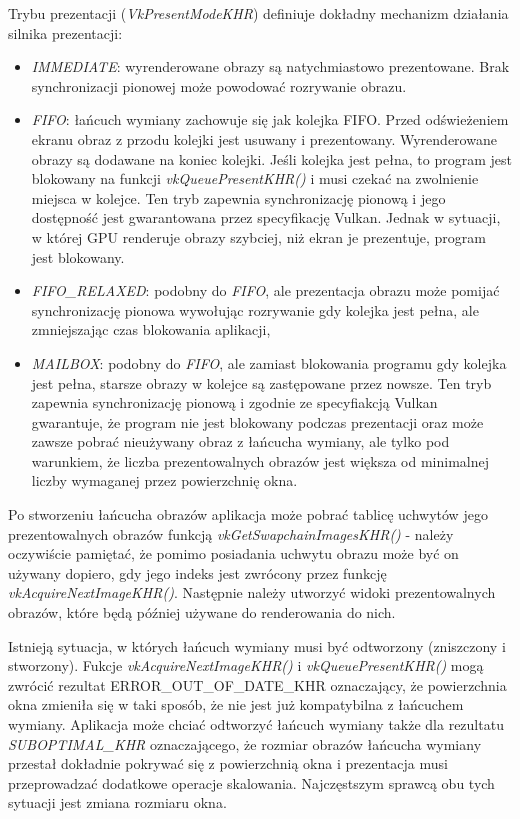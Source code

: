 Trybu prezentacji (\textit{VkPresentModeKHR}) definiuje dokładny mechanizm działania silnika prezentacji:
\begin{itemize}
	\item \textit{IMMEDIATE}: wyrenderowane obrazy są natychmiastowo prezentowane. Brak synchronizacji pionowej może powodować rozrywanie obrazu.
	\item \textit{FIFO}: łańcuch wymiany zachowuje się jak kolejka FIFO. Przed odświeżeniem ekranu obraz z przodu kolejki jest usuwany i prezentowany. Wyrenderowane obrazy są dodawane na koniec kolejki. Jeśli kolejka jest pełna, to program jest blokowany na funkcji \textit{vkQueuePresentKHR()} i musi czekać na zwolnienie miejsca w kolejce. Ten tryb zapewnia synchronizację pionową i jego dostępność jest gwarantowana przez specyfikację Vulkan. Jednak w sytuacji, w której GPU renderuje obrazy szybciej, niż ekran je prezentuje, program jest blokowany.
	\item \textit{FIFO\_RELAXED}: podobny do \textit{FIFO}, ale prezentacja obrazu może pomijać synchronizację pionowa wywołując rozrywanie gdy kolejka jest pełna, ale zmniejszając czas blokowania aplikacji,
	\item \textit{MAILBOX}: podobny do \textit{FIFO}, ale zamiast blokowania programu gdy kolejka jest pełna, starsze obrazy w kolejce są zastępowane przez nowsze. Ten tryb zapewnia synchronizację pionową i zgodnie ze specyfiakcją Vulkan gwarantuje, że program nie jest blokowany podczas prezentacji oraz może zawsze pobrać nieużywany obraz z łańcucha wymiany, ale tylko pod warunkiem, że liczba prezentowalnych obrazów jest większa od minimalnej liczby wymaganej przez powierzchnię okna.
\end{itemize}

Po stworzeniu łańcucha obrazów aplikacja może pobrać tablicę uchwytów jego prezentowalnych obrazów funkcją \textit{vkGetSwapchainImagesKHR()} - należy oczywiście pamiętać, że pomimo posiadania uchwytu obrazu może być on używany dopiero, gdy jego indeks jest zwrócony przez funkcję \textit{vkAcquireNextImageKHR()}.
Następnie należy utworzyć widoki prezentowalnych obrazów, które będą później używane do renderowania do nich.

Istnieją sytuacja, w których łańcuch wymiany musi być odtworzony (zniszczony i stworzony).
Fukcje \textit{vkAcquireNextImageKHR()} i \textit{vkQueuePresentKHR()} mogą zwrócić rezultat
ERROR\_OUT\_OF\_DATE\_KHR oznaczający, że powierzchnia okna zmieniła się w taki sposób, że nie jest już kompatybilna z łańcuchem wymiany.
Aplikacja może chciać odtworzyć łańcuch wymiany także dla rezultatu \textit{SUBOPTIMAL\_KHR} oznaczającego, że rozmiar obrazów łańcucha wymiany przestał dokładnie pokrywać się z powierzchnią okna i prezentacja musi przeprowadzać dodatkowe operacje skalowania.
Najczęstszym sprawcą obu tych sytuacji jest zmiana rozmiaru okna.


